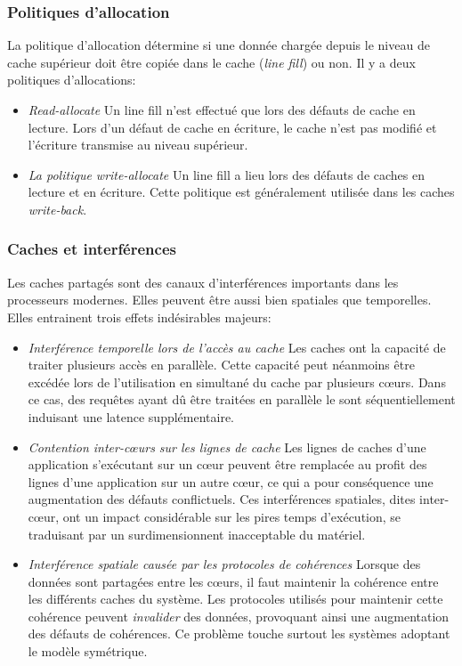 \subsubsection{Politiques d'allocation}

La politique d'allocation détermine si une donnée chargée depuis le niveau de cache supérieur doit être copiée dans le cache (\emph{line fill}) ou non.
Il y a deux politiques d'allocations:

\begin{itemize}
	\item \emph{Read-allocate} Un line fill n'est effectué que lors des défauts de cache en lecture.
	Lors d'un défaut de cache en écriture, le cache n'est pas modifié et l'écriture transmise au niveau supérieur.
	\item \emph{La politique write-allocate} Un line fill a lieu lors des défauts de caches en lecture et en écriture.
	Cette politique est généralement utilisée dans les caches \emph{write-back}.
\end{itemize}

\subsubsection{Caches et interférences}

Les caches partagés sont des canaux d'interférences importants dans les processeurs modernes.
Elles peuvent être aussi bien spatiales que temporelles.
Elles entrainent trois effets indésirables majeurs:

\begin{itemize}
	\item \emph{Interférence temporelle lors de l'accès au cache} Les caches ont la capacité de traiter plusieurs accès en parallèle.
	Cette capacité peut néanmoins être excédée lors de l'utilisation en simultané du cache par plusieurs cœurs.
	Dans ce cas, des requêtes ayant dû être traitées en parallèle le sont séquentiellement induisant une latence supplémentaire.
	
	\item \emph{Contention inter-cœurs sur les lignes de cache} Les lignes de caches d'une application s'exécutant sur un cœur peuvent être remplacée au profit des lignes d'une application sur un autre cœur, ce qui a pour conséquence une augmentation des défauts conflictuels.
	Ces interférences spatiales, dites inter-cœur, ont un impact considérable sur les pires temps d'exécution, se traduisant par un surdimensionnent inacceptable du matériel.

	\item \emph{Interférence spatiale causée par les protocoles de cohérences} Lorsque des données sont partagées entre les cœurs, il faut maintenir la cohérence entre les différents caches du système.
	Les protocoles utilisés pour maintenir cette cohérence peuvent \emph{invalider} des données, provoquant ainsi une augmentation des défauts de cohérences.
	Ce problème touche surtout les systèmes adoptant le modèle symétrique.

\end{itemize}

